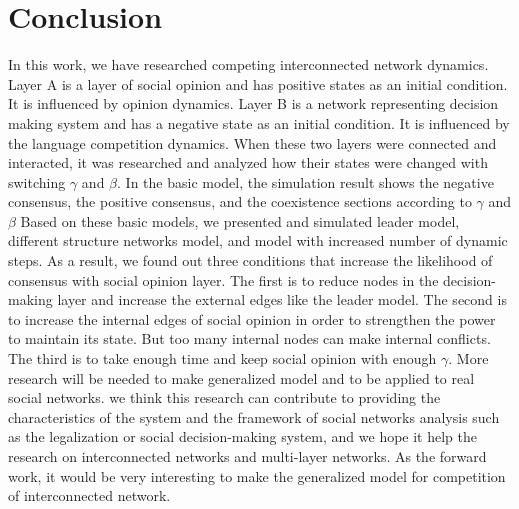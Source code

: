\documentclass[english]{cccconf}
\begin{document}
\section{Conclusion}
In this work, we have researched competing interconnected network dynamics. Layer A is a layer of social opinion and has positive states as an initial condition. It is influenced by opinion dynamics. Layer B is a network representing decision making system and has a negative state as an initial condition. It is influenced by the language competition dynamics. When these two layers were connected and interacted, it was researched and analyzed how their states were changed with switching $\gamma$ and $\beta$.
In the basic model, the simulation result shows the negative consensus, the positive consensus, and the coexistence sections according to $\gamma$ and $\beta$
Based on these basic models, we presented and simulated leader model, different structure networks model, and model with increased number of dynamic steps. As a result, we found out three conditions that increase the likelihood of consensus with social opinion layer. The first is to reduce nodes in the decision-making layer and increase the external edges like the leader model. The second is to increase the internal edges of social opinion in order to strengthen the power to maintain its state. But too many internal nodes can make internal conflicts. The third is to take enough time and keep social opinion with enough $\gamma$.
More research will be needed to make generalized model and to be applied to real social networks. we think this research can contribute to providing the characteristics of the system and the framework of social networks analysis such as the legalization or social decision-making system, and we hope it help the research on interconnected networks and multi-layer networks. As the forward work, it would be very interesting to make the generalized model for competition of interconnected network.
\end{document}
